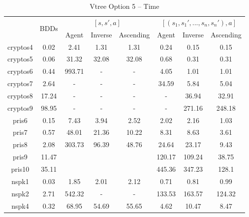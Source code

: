 \documentclass[11pt]{report}
\begin{document}
\begin{table}
\centering
\begin{tabular}{|*{8}{c|}}
\hline
& \multirow{2}{*}{BDDs} & \multicolumn{3}{c|}{$[s, s', a]$}& \multicolumn{3}{c|}{$[(s_1, s_1', ..., s_n, s_n'), a]$}\\ \cline{3-8}
& & Agent & Inverse & Ascending & Agent & Inverse &  Ascending \\ \hline
cryptos4 & 0.02 & 2.41 & 1.31 & 1.31& 0.24 & 0.15 & 0.15 \\ \hline
cryptos5 & 0.06 & 31.32 & 32.08 & 32.08&0.68& 0.31 & 0.31 \\ \hline
cryptos6 & 0.44 & 993.71& - & - & 4.05 & 1.01 & 1.01 \\ \hline
cryptos7 & 2.64 & - & - & - & 34.59 & 5.84 & 5.04\\ \hline
cryptos8 & 17.24 & - & - & - & - & 36.94 & 32.91 \\ \hline
cryptos9 & 98.95 & - & - & - & - & 271.16 & 248.18\\ \hline
pris6 & 0.15 & 7.43 & 3.94 & 2.52 & 2.02 & 2.16 & 1.03 \\ \hline
pris7 & 0.57 & 48.01 & 21.36 & 10.22& 8.31 & 8.63 & 3.61 \\ \hline
pris8 & 2.08 & 303.73 & 96.39 & 48.76 & 24.64 & 23.17 & 9.43 \\ \hline
pris9 & 11.47 &  &  &  & 120.17& 109.24 & 38.75 \\ \hline
pris10 & 35.11 &  &  &  & 445.36& 347.23 & 128.1\\ \hline
nspk1 & 0.03 & 1.85 & 2.01 & 2.12 & 0.71 &0.81&  0.99\\ \hline
nspk2 & 2.71 & 542.32& - & - & 133.53 & 163.57 &  124.32\\ \hline
nspk4 & 0.32 & 68.95 &54.69 & 55.65 & 4.62 & 10.47 & 8.47\\ \hline
\end{tabular}
\caption{Vtree Option 5 -- Time}
\label{table:vtree5time}
\end{table}
\end{document}
